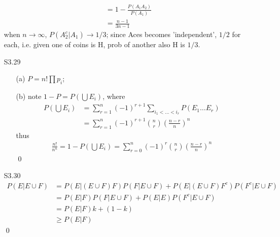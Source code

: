\documentclass[paper=a4, fontsize=11pt]{scrartcl} %
\numberwithin{equation}{section} %
\numberwithin{figure}{section} %
\numberwithin{table}{section} %
\begin{document}
\begin{itemize}
\begin{align}
			&= 1 - \frac{P(A_1A_2)}{P(A_1)}\\
			&= \frac{n-1}{3n-1}
	\end{align}
	when $n\rightarrow\infty$, $P(A_2^c|A_1)\rightarrow 1/3$; since Aces becomes 'independent', $1/2$ for each, i.e. given one of coins is H, prob of another also H is $1/3$.
	\item[S3.29]
	\begin{itemize}
		\item[(a)] $P=n!\prod p_i$;
		\item[(b)] note $1-P = P(\bigcup E_i)$, where
		\begin{align}
			P(\bigcup E_i) &= \sum_{r=1}^n (-1)^{r+1} \sum_{i_1<\dots<i_r} P(E_1\dots E_r)\\
				&= \sum_{r=1}^n (-1)^{r+1} {n\choose r} \left(\frac{n-r}{n}\right)^n
		\end{align}
		thus 
		\begin{align}
			\frac{n!}{n^n} =  1 - P(\bigcup E_i) = \sum_{r=0}^n (-1)^{r} {n\choose r} \left(\frac{n-r}{n}\right)^n
		\end{align}\qed
	\end{itemize}
	\item[S3.30]
	\begin{align}
		P(E|E\cup F) &= P(E|(E\cup F)F) P(F|E\cup F) + P(E|(E\cup F)F^c)P(F^c|E\cup F)\\
			&= P(E|F) P(F|E\cup F) + P(E|E) P(F^c|E\cup F)\\
			&= P(E|F) k + (1-k)\\
			&\geq P(E|F)
	\end{align}\qed
\end{itemize}
\end{document}
